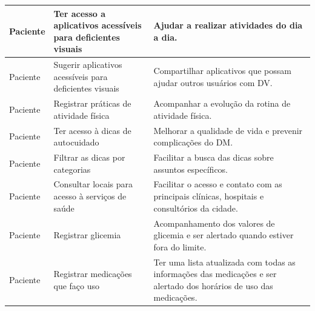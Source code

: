 \begin{table}[htb]
\begin{center}
\begin{tabular}{p{2.0cm}|p{5.0cm}|p{7.0cm}}
            \hline
            Paciente                                                       &
            Ter acesso a aplicativos acessíveis para deficientes visuais   &
            Ajudar a realizar atividades do dia a dia.                                                                          \\
            \hline
            Paciente                                                       &
            Sugerir aplicativos acessíveis para deficientes visuais        &
            Compartilhar aplicativos que possam ajudar outros usuários com DV\@.                                                \\
            \hline
            Paciente                                                       &
            Registrar práticas de atividade física                         &
            Acompanhar a evolução da rotina de atividade física.                                                                \\
            \hline
            Paciente                                                       &
            Ter acesso à dicas de autocuidado                              &
            Melhorar a qualidade de vida e prevenir complicações do DM\@.                                                       \\
            \hline
            Paciente                                                       &
            Filtrar as dicas por categorias                                &
            Facilitar a busca das dicas sobre assuntos específicos.                                                             \\
            \hline
            Paciente                                                       &
            Consultar locais para acesso à serviços de saúde               &
            Facilitar o acesso e contato com as principais clínicas, hospitais e consultórios da cidade.                        \\
            \hline
            Paciente                                                       &
            Registrar glicemia                                             &
            Acompanhamento dos valores de glicemia e ser alertado quando estiver fora do limite.                                \\
            \hline
            Paciente                                                       &
            Registrar medicações que faço uso                              &
            Ter uma lista atualizada com todas as informações das medicações e ser alertado dos horários de uso das medicações. \\

\end{tabular}
\end{center}
\end{table}
